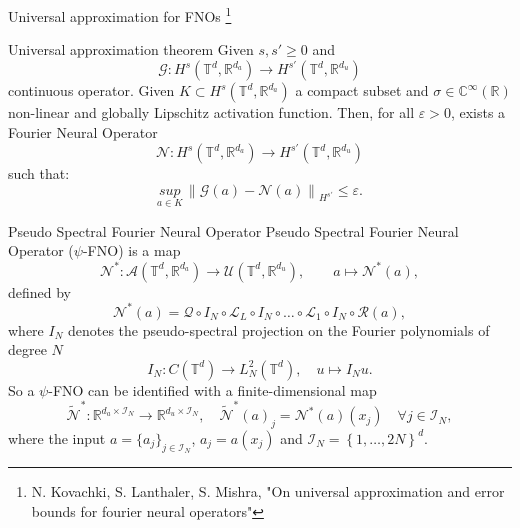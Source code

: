\documentclass{beamer}
\newcommand{\numberset}{\mathbb}
\newcommand{\R}{\numberset{R}}
\newcommand{\C}{\numberset{C}}
\begin{document}

\begin{frame}{Universal approximation for FNOs \footnote{N. Kovachki, S. Lanthaler, S. Mishra, "On universal approximation and error bounds for fourier neural operators"}}
	\begin{themedTitleBlock}{Universal approximation theorem} %
		Given $ s, s' \ge 0 $ and 
		\[ \mathcal{G}: H^s(\mathbb{T}^d, \R^{d_a}) \to H^{s'}(\mathbb{T}^d, \R^{d_u}) \]
		continuous operator. Given $ K \subset H^s(\mathbb{T}^d, \R^{d_a}) $ a compact subset and $ \sigma \in \C^{\infty}(\R) $ non-linear and globally Lipschitz activation function. Then, for all $ \varepsilon > 0 $, exists a Fourier Neural Operator
		\[ \mathcal{N}: H^s(\mathbb{T}^d, \R^{d_a}) \to H^{s'}(\mathbb{T}^d, \R^{d_u}) \]
		such that:
		\[ \underset{a \in K}{sup}\, \left\| \mathcal{G}(a) - \mathcal{N}(a) \right\|_{H^{s'}} \le \varepsilon.  \]
	\end{themedTitleBlock}
\end{frame}


\begin{frame}{Pseudo Spectral Fourier Neural Operator}
	Pseudo Spectral Fourier Neural Operator ($\psi$-FNO) is a map
	\[ \mathcal{N}^{*}: \mathcal{A}(\mathbb{T}^d, \R^{d_a}) \to \mathcal{U}(\mathbb{T}^d, \R^{d_u}), \qquad a \mapsto \mathcal{N}^{*}(a), \]
	defined by	
	\[\mathcal{N}^{*}(a) = \mathcal{Q} \circ I_N \circ \mathcal{L}_L \circ I_N \circ \dots \circ \mathcal{L}_1 \circ I_N \circ \mathcal{R}(a),	\]
	where $ I_N $ denotes the pseudo-spectral projection on the Fourier polynomials of degree $N$
	\[ I_N : C(\mathbb{T}^d) \to L^{2}_{N}(\mathbb{T}^{d}), \quad u \mapsto I_Nu. \]
	\pause
	So a $ \psi $-FNO can be identified with a finite-dimensional map 
	\[ \widetilde{\mathcal{N}}^{*}: \R^{d_a \times \mathcal{I}_N} \to \R^{d_u \times \mathcal{I}_N}, \quad \widetilde{\mathcal{N}}^{*}(a)_j = \mathcal{N}^{*}(a)(x_j) \quad \forall j \in \mathcal{I}_N, \]
	where the input $a = \{a_j\}_{j\in \mathcal{I}_N}$, $a_j = a(x_j)$ and $ \mathcal{I}_N = \left\lbrace 1, \dots, 2N \right\rbrace^d $.
\end{frame}

\end{document}
